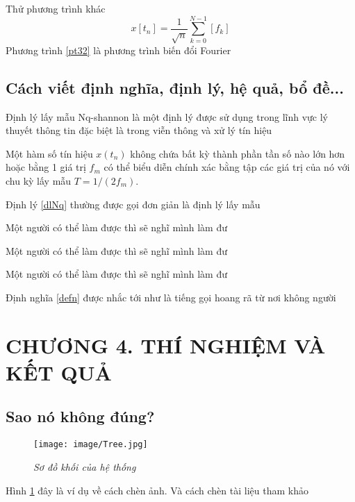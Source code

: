 Thử phương trình khác 
\begin{equation}
    \label{pt32}
    x[t_n] = \frac{1}{\sqrt{n}} \sum_{k=0}^{N-1}[f_k]
\end{equation}
Phương trình \ref{pt32} là phương trình biến đổi Fourier
\subsection{Cách viết định nghĩa, định lý, hệ quả, bổ đề...}
Định lý lấy mẫu Nq-shannon là một định lý được sử dụng trong lĩnh vực lý thuyết thông tin đặc biệt là trong viễn thông và xử lý tín hiệu 
\begin{theorem} %
    \label{dlNq}
    Một hàm số tín hiệu  $x(t_n)$ không chứa bất kỳ thành phần tần số nào lớn hơn hoặc bằng 1 giá trị $f_m$ có thể biểu diễn chính xác bằng tập các giá trị của nó với chu kỳ lấy mẫu $T = 1/(2f_m)$.
\end{theorem}
Định lý \ref{dlNq} thường được gọi đơn giản là định lý lấy mẫu 
\begin{corollary}
    Một người có thể làm được thì sẽ nghĩ mình làm đư
\end{corollary}
\begin{lemma}
    Một người có thể làm được thì sẽ nghĩ mình làm đư
\end{lemma}
\begin{defn}
    \label{defn}
    Một người có thể làm được thì sẽ nghĩ mình làm đư
\end{defn}
Định nghĩa \ref{defn} được nhắc tới như là tiếng gọi hoang rã từ nơi không người
\cleardoublepage

\section*{\centering CHƯƠNG 4. THÍ NGHIỆM VÀ KẾT QUẢ}
\setcounter{section}{4}
\setcounter{subsection}{0}
\setcounter{figure}{0}
\setcounter{table}{0}
\subsection{Sao nó không đúng?}
\lipsum
\begin{figure}[H]
    \centering
    \texttt{[image: image/Tree.jpg]}
    \caption[Sơ đồ khối của hệ thống]{\textit{\fontsize{12pt}{0}\selectfont Sơ đồ khối của hệ thống}}
    \label{hinh4.1}
\end{figure}
Hình \ref{hinh4.1} đây là ví dụ về cách chèn ảnh. Và cách chèn tài liệu tham khảo \cite{bracewell1989fourier}
\cleardoublepage